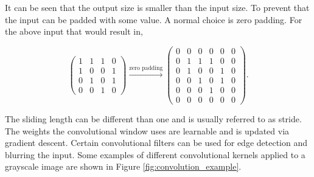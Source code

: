 \begin{description}
        It can be seen that the output size is smaller than the input size. To
        prevent that the input can be padded with some value. A normal choice is
        zero padding. For the above input that would result in,

        \begin{equation}
            \begin{pmatrix}
                1 & 1 & 1 & 0 \\
                1 & 0 & 0 & 1 \\
                0 & 1 & 0 & 1 \\
                0 & 0 & 1 & 0
            \end{pmatrix} \xrightarrow{\text{zero padding}}
            \begin{pmatrix}
                0 & 0 & 0 & 0 & 0 & 0 \\
                0 & 1 & 1 & 1 & 0 & 0 \\
                0 & 1 & 0 & 0 & 1 & 0 \\
                0 & 0 & 1 & 0 & 1 & 0 \\
                0 & 0 & 0 & 1 & 0 & 0 \\
                0 & 0 & 0 & 0 & 0 & 0
            \end{pmatrix}.
        \end{equation}

        The sliding length can be different than one and is usually referred
        to as stride. The weights the convolutional window uses are learnable
        and is updated via gradient descent. Certain convolutional filters can
        be used for edge detection and blurring the input. Some examples of
        different convolutional kernels applied to a grayscale image are shown
        in Figure \ref{fig:convolution_example}.


\end{description}
